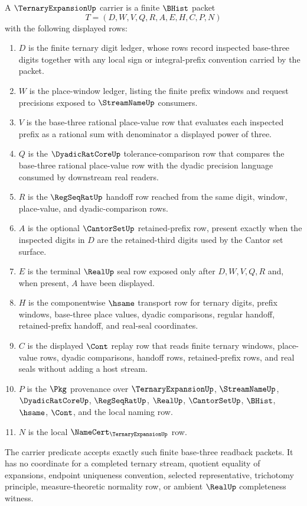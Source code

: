 \begin{definition}\label{def:ternary-expansion-carrier}
A $\TernaryExpansionUp$ carrier is a finite $\BHist$ packet
$$
T=(D,W,V,Q,R,A,E,H,C,P,N)
$$
with the following displayed rows:
\begin{enumerate}
\item $D$ is the finite ternary digit ledger, whose rows record inspected base-three digits together with any local sign or integral-prefix convention carried by the packet.
\item $W$ is the place-window ledger, listing the finite prefix windows and request precisions exposed to $\StreamNameUp$ consumers.
\item $V$ is the base-three rational place-value row that evaluates each inspected prefix as a rational sum with denominator a displayed power of three.
\item $Q$ is the $\DyadicRatCoreUp$ tolerance-comparison row that compares the base-three rational place-value row with the dyadic precision language consumed by downstream real readers.
\item $R$ is the $\RegSeqRatUp$ handoff row reached from the same digit, window, place-value, and dyadic-comparison rows.
\item $A$ is the optional $\CantorSetUp$ retained-prefix row, present exactly when the inspected digits in $D$ are the retained-third digits used by the Cantor set surface.
\item $E$ is the terminal $\RealUp$ seal row exposed only after $D,W,V,Q,R$ and, when present, $A$ have been displayed.
\item $H$ is the componentwise $\hsame$ transport row for ternary digits, prefix windows, base-three place values, dyadic comparisons, regular handoff, retained-prefix handoff, and real-seal coordinates.
\item $C$ is the displayed $\Cont$ replay row that reads finite ternary windows, place-value rows, dyadic comparisons, handoff rows, retained-prefix rows, and real seals without adding a host stream.
\item $P$ is the $\Pkg$ provenance over $\TernaryExpansionUp$, $\StreamNameUp$, $\DyadicRatCoreUp$, $\RegSeqRatUp$, $\RealUp$, $\CantorSetUp$, $\BHist$, $\hsame$, $\Cont$, and the local naming row.
\item $N$ is the local $\NameCert_{\TernaryExpansionUp}$ row.
\end{enumerate}
The carrier predicate accepts exactly such finite base-three readback packets. It has no coordinate for a completed ternary stream, quotient equality of expansions, endpoint uniqueness convention, selected representative, trichotomy principle, measure-theoretic normality row, or ambient $\RealUp$ completeness witness.
\end{definition}

